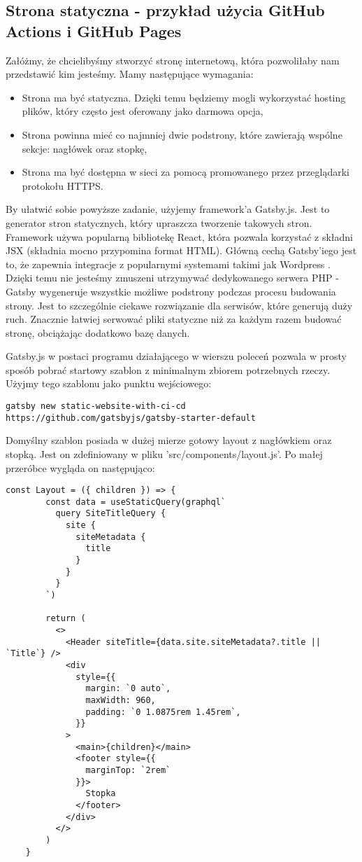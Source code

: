 \subsection{Strona statyczna - przykład użycia GitHub Actions i GitHub Pages}
Załóżmy, że chcielibyśmy stworzyć stronę internetową, która pozwoliłaby nam przedstawić kim jesteśmy. Mamy następujące wymagania:
\begin{itemize}
    \item Strona ma być statyczna. Dzięki temu będziemy mogli wykorzystać hosting plików, który często jest oferowany jako darmowa opcja,
    \item Strona powinna mieć co najmniej dwie podstrony, które zawierają wspólne sekcje: nagłówek oraz stopkę,
    \item Strona ma być dostępna w sieci za pomocą promowanego przez przeglądarki protokołu HTTPS.
\end{itemize}
By ułatwić sobie powyższe zadanie, użyjemy framework'a Gatsby.js. Jest to generator stron statycznych, który upraszcza tworzenie takowych stron. Framework używa popularną bibliotekę React, która pozwala korzystać z składni JSX (składnia mocno przypomina format HTML). Główną cechą Gatsby'iego jest to, że zapewnia integracje z popularnymi systemami takimi jak Wordpress \cite{GatsbyJSWordpress}. Dzięki temu nie jesteśmy zmuszeni utrzymywać dedykowanego serwera PHP - Gatsby wygeneruje wszystkie możliwe podstrony podczas procesu budowania strony. Jest to szczególnie ciekawe rozwiązanie dla serwisów, które generują duży ruch. Znacznie łatwiej serwować pliki statyczne niż za każdym razem budować stronę, obciążając dodatkowo bazę danych.
\par
Gatsby.js w postaci programu działającego w wierszu poleceń pozwala w prosty sposób pobrać startowy szablon z minimalnym zbiorem potrzebnych rzeczy. Użyjmy tego szablonu jako punktu wejściowego:
\begin{lstlisting}[caption={Pobierania szablonu startowego}]
    gatsby new static-website-with-ci-cd https://github.com/gatsbyjs/gatsby-starter-default
\end{lstlisting}
Domyślny szablon posiada w dużej mierze gotowy layout z nagłówkiem oraz stopką. Jest on zdefiniowany w pliku 'src/components/layout.js'. Po małej przeróbce wygląda on następująco:
\begin{lstlisting}[caption={Layout - komponent zawierający logikę związaną z layoutem strony}]
    const Layout = ({ children }) => {
        const data = useStaticQuery(graphql`
          query SiteTitleQuery {
            site {
              siteMetadata {
                title
              }
            }
          }
        `)
      
        return (
          <>
            <Header siteTitle={data.site.siteMetadata?.title || `Title`} />
            <div
              style={{
                margin: `0 auto`,
                maxWidth: 960,
                padding: `0 1.0875rem 1.45rem`,
              }}
            >
              <main>{children}</main>
              <footer style={{
                marginTop: `2rem`
              }}>
                Stopka
              </footer>
            </div>
          </>
        )
    }
\end{lstlisting}
